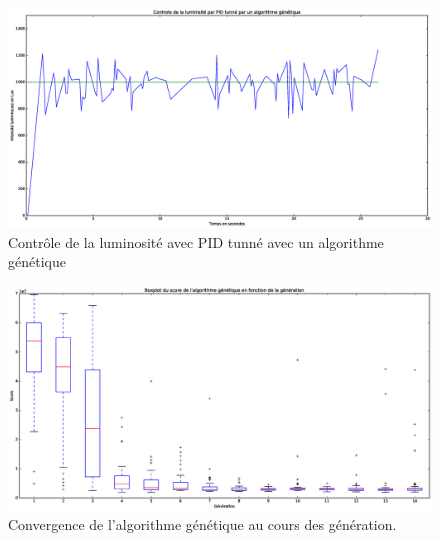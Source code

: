 \documentclass[a4paper,10pt]{report}
\begin{document}
\begin{figure}[htb!]
   \centering
   \includegraphics[scale=0.35]{Genetic.eps}
   \caption{\label{fig:genetique} Contrôle de la luminosité avec PID tunné avec un algorithme génétique}
\end{figure}

\begin{figure}[htb!]
   \centering
   \includegraphics[scale=0.35]{GeneticBoxplot.eps}
    \caption{\label{fig:convergence} Convergence de l'algorithme génétique au cours des génération.}
\end{figure}
\end{document}
